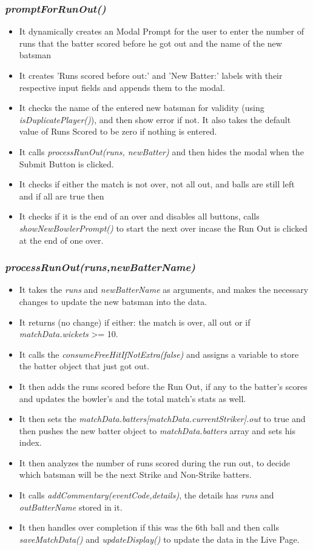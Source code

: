 \documentclass[a4paper,12pt]{article}
\begin{document}
\subsubsection{\textit{promptForRunOut()}}
\label{runOut1}
\begin{itemize}
\item It dynamically creates an Modal Prompt for the user to enter the number of runs that the batter scored before he got out and the name of the new batsman
\item It creates 'Runs scored before out:' and 'New Batter:' labels with their respective input fields and appends them to the modal.
\item It checks the name of the entered new batsman for validity (using \textit{isDuplicatePlayer()}), and then show error if not. It also takes the default value of Runs Scored to be zero if nothing is entered.
\item It calls \textit{processRunOut(runs, newBatter)} and then hides the modal when the Submit Button is clicked.
\item It checks if either the match is not over, not all out, and balls are still left and if all are true then
\item It checks if it is the end of an over and disables all buttons, calls \textit{showNewBowlerPrompt()} to start the next over incase the Run Out is clicked at the end of one over. 
\end{itemize}

\subsubsection{\textit{processRunOut(runs,newBatterName)}}
\label{runOut2}
\begin{itemize}
\item It takes the \textit{runs} and \textit{newBatterName} as arguments, and makes the necessary changes to update the new batsman into the data.
\item It returns (no change) if either: the match is over, all out or if \textit{matchData.wickets} >= 10.
\item It calls the \textit{consumeFreeHitIfNotExtra(false)} and assigns a variable to store the batter object that just got out.
\item It then adds the runs scored before the Run Out, if any to the batter's scores and updates the bowler's and the total match's stats as well.
\item It then sets the \textit{matchData.batters[matchData.currentStriker].out} to true and then pushes the new batter object to \textit{matchData.batters} array and sets his index.
\item It then analyzes the number of runs scored during the run out, to decide which batsman will be the next Strike and Non-Strike batters.
\item It calls \textit{addCommentary(eventCode,details)}, the details has \textit{runs} and \textit{outBatterName} stored in it.
\item It then handles over completion if this was the 6th ball and then calls \textit{saveMatchData()} and \textit{updateDisplay()} to update the data in the Live Page. 
\end{itemize}
\end{document}
